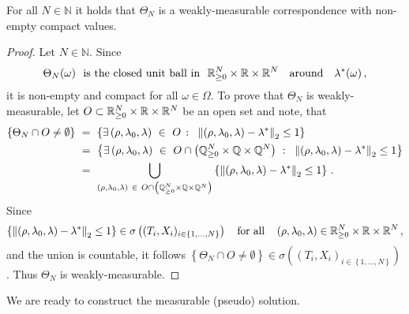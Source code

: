 \begin{lemma}
  \label{Theta_maes}
  For all $N\in\mathbb{N}$ it holds that 
  $\Theta_N$ is a weakly-measurable correspondence  with non-empty compact values.
\end{lemma}
\begin{proof}
  Let $N\in\mathbb{N}$. 
  Since 
  \begin{align*}
  \Theta_N(\omega)
  \ 
  \text{
  is the closed unit ball
  in
  }
  \ 
\R^N_{\ge 0}\times \R\times \R^N
\quad 
\text{around}
\quad 
  \lambda^*(\omega) 
  \,,
  \end{align*}
  it is non-empty and compact for all $\omega\in\Omega$.
  To prove that $\Theta_N$ is weakly-measurable,
  let 
  $
  O\subset
\mathbb{R}^N_{\ge 0}\times \mathbb{R}\times \mathbb{R}^N
  $
  be an open set and note, that
  \begin{align*}
    \left\{ 
      \Theta_N\cap O \neq \emptyset
    \right\}
    &
    \ 
    =
    \ 
    \left\{ 
      \exists
  \left( 
  \rho,\lambda_0,\lambda
  \right)
  \ 
  \in
  \ 
  O
\ 
\colon
\ 
\norm{
  \left( 
  \rho,\lambda_0,\lambda
  \right)
-\lambda^*}_2\le 1
    \right\}
    \\
    &
    \ 
    =
    \ 
    \left\{ 
      \exists
  \left( 
  \rho,\lambda_0,\lambda
  \right)
  \ 
  \in
  \ 
  O
  \cap
  \left( 
  \mathbb{Q}^N_{\ge 0}\times \mathbb{Q}\times \mathbb{Q}^N
  \right)
\ 
\colon
\ 
\norm{
  \left( 
  \rho,\lambda_0,\lambda
  \right)
-\lambda^*}_2\le 1
    \right\}
    \\
&
    \ 
    =
    \ 
    \bigcup_{
  \left( 
  \rho,\lambda_0,\lambda
  \right)
  \ 
  \in
  \ 
  O
  \cap
  \left( 
  \mathbb{Q}^N_{\ge 0}\times \mathbb{Q}\times \mathbb{Q}^N
  \right)
    }
    \left\{ 
\norm{
  \left( 
  \rho,\lambda_0,\lambda
  \right)
-\lambda^*}_2\le 1
    \right\}
    \,.
  \end{align*}
  Since
  \begin{align*}
    \left\{ 
\left\lVert
  \left( 
  \rho,\lambda_0,\lambda
  \right)
-\lambda^*\right\rVert_2\le 1
    \right\}
    \in
\sigma
\left( 
  (T_i,X_i)_{i\in 
\left\{ 1,\ldots,N \right\}
  } 
\right)
\quad
\text{for all}\quad
  \left( 
  \rho,\lambda_0,\lambda
  \right)
  \in
\mathbb{R}^N_{\ge 0}\times \mathbb{R}\times \mathbb{R}^N
\,,
  \end{align*}
  and the union is countable, it follows
  $
    \left\{ 
      \Theta_N\cap O \neq \emptyset
    \right\}
    \in
\sigma
\left( 
  (T_i,X_i)_{i\in 
\left\{ 1,\ldots,N \right\}
  } 
\right)
  $.
  Thus $\Theta_N$ is weakly-measurable.
\end{proof}
We are ready to construct the measurable (pseudo) solution.
